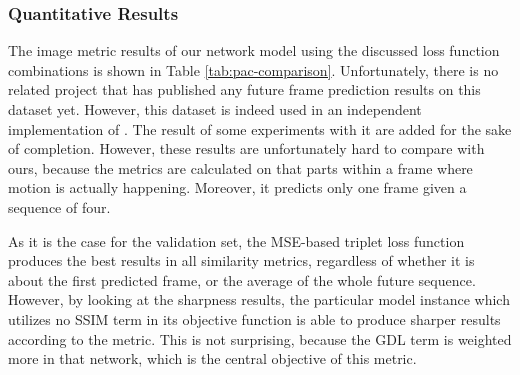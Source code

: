 \subsubsection{Quantitative Results}

The image metric results of our network model using the discussed loss function combinations is shown in Table \ref{tab:pac-comparison}. Unfortunately, there is no related project that has published any future frame prediction results on this dataset yet. However, this dataset is indeed used in an independent implementation of \parencite{deep_multiscale_video_pred}. The result of some experiments with it are added for the sake of completion. However, these results are unfortunately hard to compare with ours, because the metrics are calculated on that parts within a frame where motion is actually happening. Moreover, it predicts only one frame given a sequence of four.

As it is the case for the validation set, the MSE-based triplet loss function produces the best results in all similarity metrics, regardless of whether it is about the first predicted frame, or the average of the whole future sequence. However, by looking at the sharpness results, the particular model instance which utilizes no SSIM term in its objective function is able to produce sharper results according to the metric. This is not surprising, because the GDL term is weighted more in that network, which is the central objective of this metric.

